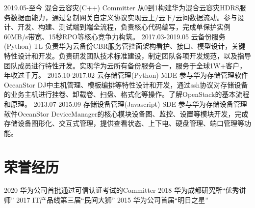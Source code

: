 \documentclass[]{resume}
\begin{document}
\begin{twenty}
  \twentyitem
    {2019.05-至今}
    {混合云容灾(C++)}
    {Committer}
    {从0到1构建华为混合云容灾HDRS服务数据面能力，通过复制网关自定义协议实现云上/云下/云间数据流动。参与设计、开发、构建、测试端到端全流程，负责核心代码编写，完成单保护实例60MB/s带宽、15秒RPO等核心竞争力构筑。}
  \twentyitem
    {2017.03-2019.05}
    {云备份服务(Python)}
    {TL}
    {负责华为云备份CBR服务管控面架构看护、接口、模型设计，关键特性设计和开发。负责研发团队技术标准建设，制定团队各项开发规范，以及指导团队成员进行特性开发。实现华为云所有备份服务合一，服务于全球1W+客户，年收过千万。}
\twentyitem
    {2015.10-2017.02}
    {云存储管理(Python)}
    {MDE}
    {参与华为存储管理软件OceanStor DJ中主机管理、模板编排等特性设计和开发，通过ssh协议对存储设备的业务主机进行挂卷、卸载卷、扫盘、格式化等操作。了解OpenStack的基本流程和原理。}
\twentyitem
    {2013.07-2015.09}
    {存储设备管理(Javascript)}
    {SDE}
    {参与华为存储设备管理软件OceanStor DeviceManager的核心模块设备图、监控、设置等模块开发，完成存储设备图形化、交互式管理，提供查看状态、上下电、硬盘管理、端口管理等功能。}
\end{twenty}

\section{荣誉经历}

\begin{twentyshort}
  \twentyitemshort
    {2020}
    {华为公司首批通过可信认证考试的Committer}
  \twentyitemshort
    {2018}
    {华为成都研究所“优秀讲师”}
  \twentyitemshort
    {2017}
    {IT产品线第三届“民间大狮”}
  \twentyitemshort
    {2015}
    {华为公司首届“明日之星”}
\end{twentyshort}

\end{document}
